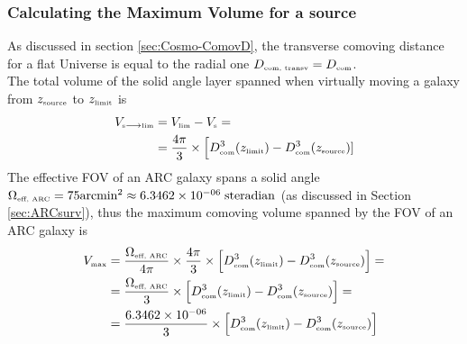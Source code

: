 \subsubsection*{Calculating the Maximum Volume for a source}
As discussed in section \ref{sec:Cosmo-ComovD}, the transverse comoving distance for a flat Universe is equal to the radial one $ D_{\mbox{\tiny{com, transv}}}  = D_{\mbox{\tiny{com}}}$.\\ 
The total volume of the solid angle layer spanned when virtually moving a galaxy from $z_{\mbox{\tiny{source}}}$ to $z_{\mbox{\tiny{limit}}}$ is 
\begin{equation}
\begin{aligned}
    V_{\mbox{\tiny{s}} \longrightarrow \mbox{\tiny{lim}}} &= V_{\mbox{\tiny{lim}}} - V_{\mbox{\tiny{s}}}=  \\ 
    & = \dfrac{4\pi}{3} \times \Big[ D^3_{\mbox{\tiny{com}}} (z_{\mbox{\tiny{limit}}} ) -  D^3_{\mbox{\tiny{com}}} (z_{\mbox{\tiny{source}}} )] 
\end{aligned} 
\label{eq:Volume_tot}
\end{equation}
The effective FOV of an ARC galaxy spans a solid angle $\Omega_{\mbox{\tiny{eff, ARC}}} = 75 \mbox{arcmin}^2 \approx 6.3462 \times 10^{-06}\; \mbox{steradian}$ (as discussed in Section \ref{sec:ARCsurv}), thus the maximum comoving volume spanned by the FOV of an ARC galaxy is
\begin{equation}
\begin{aligned}
    V_{\mbox{\tiny{max}}}  & = \dfrac{\Omega_{\mbox{\tiny{eff, ARC}}} }{4\pi}  \times \dfrac{4\pi}{3} \times \Big[ D^3_{\mbox{\tiny{com}}} (z_{\mbox{\tiny{limit}}} ) -  D^3_{\mbox{\tiny{com}}} (z_{\mbox{\tiny{source}}} )\Big] =\\
    & = \dfrac{\Omega_{\mbox{\tiny{eff, ARC}}} }{3} \times \Big[ D^3_{\mbox{\tiny{com}}} (z_{\mbox{\tiny{limit}}} ) -  D^3_{\mbox{\tiny{com}}} (z_{\mbox{\tiny{source}}} )\Big] =\\
    & = \dfrac{6.3462 \times 10^{-06}}{3} \times \Big[ D^3_{\mbox{\tiny{com}}} (z_{\mbox{\tiny{limit}}} ) -  D^3_{\mbox{\tiny{com}}} (z_{\mbox{\tiny{source}}} )\Big]
\end{aligned} 
\label{eq:Volume_max}
\end{equation}




